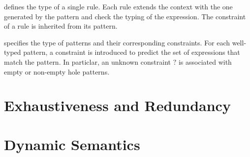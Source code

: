 \documentclass[acmsmall,screen,review,nonacm]{acmart}
\begin{document}


 defines the type of a single rule. Each rule extends the context with the one generated by the pattern and check the typing of the expression. The constraint of a rule is inherited from its pattern.



 specifies the type of patterns and their corresponding constraints. For each well-typed pattern, a constraint is introduced to predict the set of expressions that match the pattern. In particlar, an unknown constraint $?$ is associated with empty or non-empty hole patterns.
\section{Exhaustiveness and Redundancy}
\label{sec:exhaustivens-redundancy}

\section{Dynamic Semantics}
\label{sec:dynamics}



\clearpage



\end{document}

